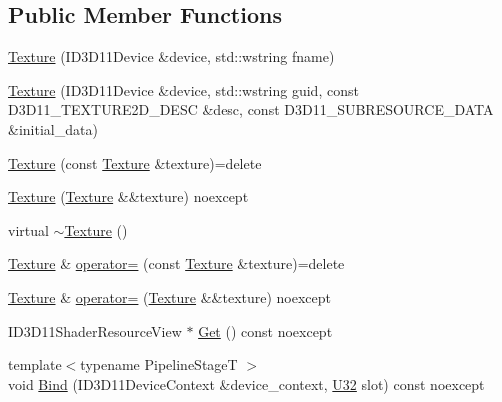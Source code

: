 \subsection*{Public Member Functions}
\begin{DoxyCompactItemize}
\item 
\mbox{\hyperlink{classmage_1_1rendering_1_1_texture_a3e250ba6d5e08d876d4a15783f7081c4}{Texture}} (I\+D3\+D11\+Device \&device, std\+::wstring fname)
\item 
\mbox{\hyperlink{classmage_1_1rendering_1_1_texture_ae98272c1963a29d5d851ca27ff9bb65c}{Texture}} (I\+D3\+D11\+Device \&device, std\+::wstring guid, const D3\+D11\+\_\+\+T\+E\+X\+T\+U\+R\+E2\+D\+\_\+\+D\+E\+SC \&desc, const D3\+D11\+\_\+\+S\+U\+B\+R\+E\+S\+O\+U\+R\+C\+E\+\_\+\+D\+A\+TA \&initial\+\_\+data)
\item 
\mbox{\hyperlink{classmage_1_1rendering_1_1_texture_adde9e2339d2c10f1fc527a0d8d41d335}{Texture}} (const \mbox{\hyperlink{classmage_1_1rendering_1_1_texture}{Texture}} \&texture)=delete
\item 
\mbox{\hyperlink{classmage_1_1rendering_1_1_texture_a25eb2aa2277478fb5c17af996d509c57}{Texture}} (\mbox{\hyperlink{classmage_1_1rendering_1_1_texture}{Texture}} \&\&texture) noexcept
\item 
virtual \mbox{\hyperlink{classmage_1_1rendering_1_1_texture_af0ca576b1131fc0ac70725127b4fa7e4}{$\sim$\+Texture}} ()
\item 
\mbox{\hyperlink{classmage_1_1rendering_1_1_texture}{Texture}} \& \mbox{\hyperlink{classmage_1_1rendering_1_1_texture_a8d6af2ca731e11e2f0ef382bc8417234}{operator=}} (const \mbox{\hyperlink{classmage_1_1rendering_1_1_texture}{Texture}} \&texture)=delete
\item 
\mbox{\hyperlink{classmage_1_1rendering_1_1_texture}{Texture}} \& \mbox{\hyperlink{classmage_1_1rendering_1_1_texture_a8c9062f5d8045272c254eb0fa1ab4feb}{operator=}} (\mbox{\hyperlink{classmage_1_1rendering_1_1_texture}{Texture}} \&\&texture) noexcept
\item 
I\+D3\+D11\+Shader\+Resource\+View $\ast$ \mbox{\hyperlink{classmage_1_1rendering_1_1_texture_a7180e555c8e9ba55b364aa0a395d9ab8}{Get}} () const noexcept
\item 
{\footnotesize template$<$typename Pipeline\+StageT $>$ }\\void \mbox{\hyperlink{classmage_1_1rendering_1_1_texture_a2189fabd729f433b96b62fa409968677}{Bind}} (I\+D3\+D11\+Device\+Context \&device\+\_\+context, \mbox{\hyperlink{namespacemage_a41c104c036fba3756a74e19f793eeaa1}{U32}} slot) const noexcept
\end{DoxyCompactItemize}
